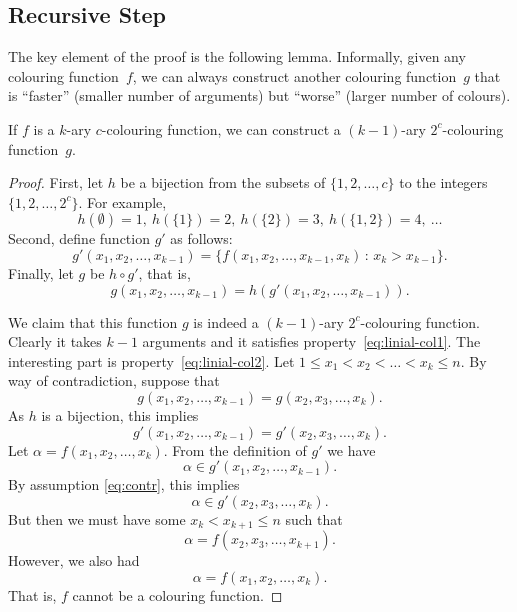 \subsection{Recursive Step}

The key element of the proof is the following lemma. Informally, given any colouring function~$f$, we can always construct another colouring function~$g$ that is ``faster'' (smaller number of arguments) but ``worse'' (larger number of colours).

\begin{lemma}\label{lem:linial-iter}
    If $f$ is a $k$-ary $c$-colouring function, we can construct a $(k-1)$-ary $2^c$-colouring function~$g$.
\end{lemma}
\begin{proof}
    First, let $h$ be a bijection from the subsets of $\{1,2,\dotsc,c\}$ to the integers $\{1,2,\dotsc,2^c\}$. For example,
    \[
        h(\emptyset) = 1,\ h(\{1\}) = 2,\ h(\{2\}) = 3,\ h(\{1,2\}) = 4,\ \dotsc
    \]
    Second, define function $g'$ as follows:
    \[
        g'(x_1, x_2, \dotsc, x_{k-1})
        = \bigl\{ f(x_1, x_2, \dotsc, x_{k-1}, x_k) \,:\, x_k > x_{k-1} \bigr\}.
    \]
    Finally, let $g$ be $h \circ g'$, that is,
    \[
        g(x_1, x_2, \dotsc, x_{k-1}) = h(g'(x_1, x_2, \dotsc, x_{k-1})).
    \]

    We claim that this function $g$ is indeed a $(k-1)$-ary $2^c$-colouring function. Clearly it takes $k-1$ arguments and it satisfies property~\eqref{eq:linial-col1}. The interesting part is property~\eqref{eq:linial-col2}. Let $1 \le x_1 < x_2 < \dotso < x_k \le n$. By way of contradiction, suppose that
    \[
        g(x_1, x_2, \dotsc, x_{k-1}) = g(x_2, x_3, \dotsc, x_k).
    \]
    As $h$ is a bijection, this implies
    \begin{equation}
        g'(x_1, x_2, \dotsc, x_{k-1}) = g'(x_2, x_3, \dotsc, x_k). \label{eq:contr}
    \end{equation}
    Let $\alpha = f(x_1, x_2, \dotsc, x_k)$.
    From the definition of $g'$ we have
    \[
        \alpha \in g'(x_1, x_2, \dotsc, x_{k-1}).
    \]
    By assumption \eqref{eq:contr}, this implies
    \[
        \alpha \in g'(x_2, x_3, \dotsc, x_k).
    \]
    But then we must have some $x_k < x_{k+1} \le n$ such that
    \[
        \alpha = f(x_2, x_3, \dotsc, x_{k+1}).
    \]
    However, we also had
    \[
        \alpha = f(x_1, x_2, \dotsc, x_k).
    \]
    That is, $f$ cannot be a colouring function.
\end{proof}


